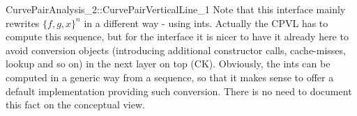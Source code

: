\begin{ccRefConcept}{CurvePairAnalysis_2::CurvePairVerticalLine_1}
Note that this interface mainly rewrites $\{f,g,x\}^n$ in a different way - 
using ints. Actually the CPVL has to compute this sequence, but for
the interface it is nicer to have it already here to avoid conversion objects
(introducing additional constructor calls, cache-misses, lookup and so on) in
the next layer on top (CK). Obviously, the ints can be computed in a generic
way from a sequence, so that it makes sense to offer a default implementation
providing such conversion. There is no need to document this fact on the 
conceptual view.



\end{ccRefConcept}

